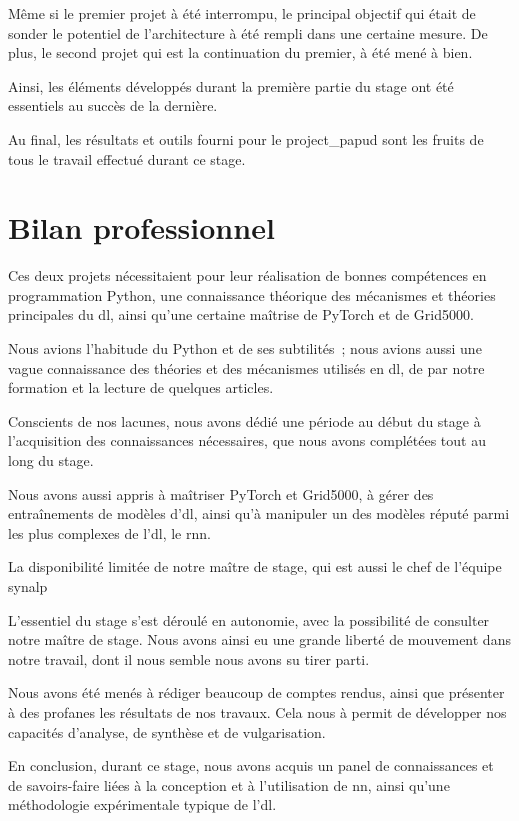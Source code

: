 Même si le premier projet à été interrompu, le principal objectif qui était de sonder le potentiel de l'architecture à été rempli dans une certaine mesure. De plus, le second projet qui est la continuation du premier, à été mené à bien.

Ainsi, les éléments développés durant la première partie du stage ont été essentiels au succès de la dernière.

Au final, les résultats et outils fourni pour le \gls{project_papud} sont les fruits de tous le travail effectué durant ce stage.

\section{Bilan professionnel}
Ces deux projets nécessitaient pour leur réalisation de bonnes compétences en programmation Python, une connaissance théorique des mécanismes et théories principales du \gls{dl}, ainsi qu'une certaine maîtrise de PyTorch et de Grid5000.

Nous avions l'habitude du Python et de ses subtilités~; nous avions aussi une vague connaissance des théories et des mécanismes utilisés en \gls{dl}, de par notre formation et la lecture de quelques articles. %

Conscients de nos lacunes, nous avons dédié une période au début du stage à l'acquisition des connaissances nécessaires, que nous avons complétées tout au long du stage.

Nous avons aussi appris à maîtriser PyTorch et Grid5000, à gérer des entraînements de modèles d'\gls{dl}, ainsi qu'à  manipuler un des modèles réputé parmi les plus complexes de l'\gls{dl}, le \gls{rnn}.

La disponibilité limitée de notre maître de stage, qui est aussi le chef de l'équipe \gls{synalp}

L'essentiel du stage s'est déroulé en autonomie, avec la possibilité de consulter notre maître de stage. Nous avons ainsi eu une grande liberté de mouvement dans notre travail, dont il nous semble nous avons su tirer parti.

Nous avons été menés à rédiger beaucoup de comptes rendus, ainsi que présenter à des profanes les résultats de nos travaux. Cela nous à permit de développer nos capacités d'analyse, de synthèse et de vulgarisation.

En conclusion, durant ce stage, nous avons acquis un panel de connaissances et de savoirs-faire liées à la conception et à l'utilisation de \gls{nn}, ainsi qu'une méthodologie expérimentale typique de l'\gls{dl}.

